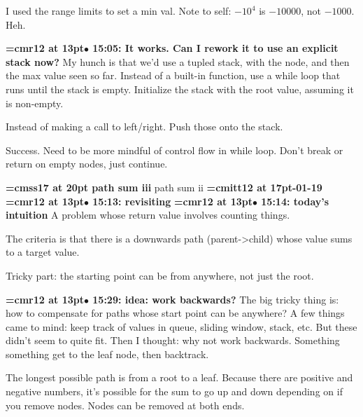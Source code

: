 I used the range limits to set a min val. Note to self: $-10^4$ is $-10000$, not $-1000$. Heh.
\par

{\smallskip\noindent\bf\font\titlefont=cmr12 at 13pt\titlefont $\bullet$ 15:05: It works. Can I rework it to use an explicit stack now?}\smallskip
My hunch is that we'd use a tupled stack, with the node, and then the max value seen so far. Instead of a built-in function, use a while loop that runs until the stack is empty. Initialize the stack with the root value, assuming it is non-empty.
\par

Instead of making a call to left/right. Push those onto the stack.
\par

Success. Need to be more mindful of control flow in while loop. Don't break or return on empty nodes, just continue.
\par

{\medskip\noindent\bf\font\titlefont=cmss17 at 20pt path sum iii} path sum ii
{\medskip\noindent\bf\font\titlefont=cmitt12 at 17pt-01-19}\medskip
{\smallskip\noindent\bf\font\titlefont=cmr12 at 13pt\titlefont $\bullet$ 15:13: revisiting}\smallskip
{\smallskip\noindent\bf\font\titlefont=cmr12 at 13pt\titlefont $\bullet$ 15:14: today's intuition}\smallskip
A problem whose return value involves counting things.
\par

The criteria is that there is a downwards path (parent->child) whose value sums to a target value.
\par

Tricky part: the starting point can be from anywhere, not just the root.
\par

{\smallskip\noindent\bf\font\titlefont=cmr12 at 13pt\titlefont $\bullet$ 15:29: idea: work backwards?}\smallskip
The big tricky thing is: how to compensate for paths whose start point can be anywhere? A few things came to mind: keep track of values in queue, sliding window, stack, etc. But these didn't seem to quite fit. Then I thought: why not work backwards. Something something get to the leaf node, then backtrack.
\par

The longest possible path is from a root to a leaf. Because there are positive and negative numbers, it's possible for the sum to go up and down depending on if you remove nodes. Nodes can be removed at both ends.
\par

